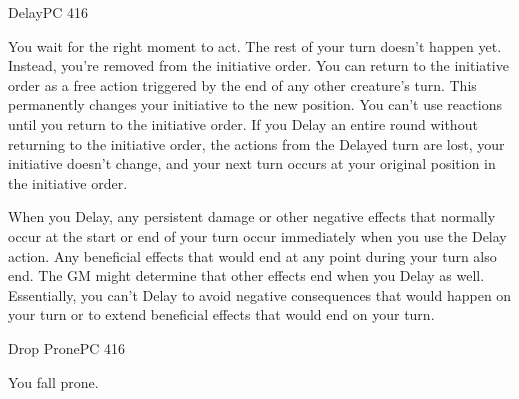 \documentclass[12pt,openany,twocolumn]{book}
\begin{document}
\begin{action}{Delay}{\freeaction{}}{PC 416}
    \begin{actioninfo}
    \end{actioninfo}

    \begin{actionbody}
        You wait for the right moment to act. The rest of your turn doesn't happen yet. Instead, you're removed from the initiative order. You can return to the initiative order as a free action triggered by the end of any other creature's turn. This permanently changes your initiative to the new position. You can't use reactions until you return to the initiative order. If you Delay an entire round without returning to the initiative order, the actions from the Delayed turn are lost, your initiative doesn't change, and your next turn occurs at your original position in the initiative order.

        When you Delay, any persistent damage or other negative effects that normally occur at the start or end of your turn occur immediately when you use the Delay action. Any beneficial effects that would end at any point during your turn also end. The GM might determine that other effects end when you Delay as well. Essentially, you can't Delay to avoid negative consequences that would happen on your turn or to extend beneficial effects that would end on your turn.
    \end{actionbody}
\end{action}

\begin{action}{Drop Prone}{}{PC 416}
    \begin{actionbody}
        You fall prone.
    \end{actionbody}
\end{action}
\end{document}
